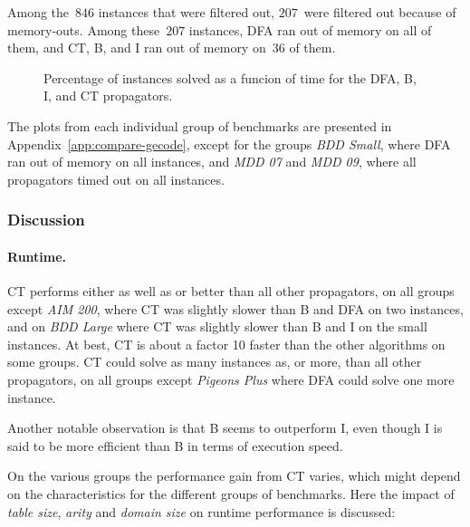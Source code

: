 \documentclass[a4paper,11pt]{article}
\numberwithin{equation}{section}
\begin{document}
Among the~$846$ instances that were filtered out, $207$~were filtered out
because of memory-outs. Among these~$207$ instances, DFA ran out of memory on all of them,
and CT, B, and I ran out of memory on~$36$ of them.

\begin{figure}
  \centering
  \begin{tikzpicture}[every mark/.append style={mark size=4pt}]%
    
  \end{tikzpicture}
  \caption{Percentage of instances solved as a funcion of time for the DFA, B, I, and CT 
    propagators.}
  \label{fig:total}
\end{figure}

The plots from each individual group of benchmarks are presented 
in Appendix~\ref{app:compare-gecode},
except for the groups \emph{BDD Small}, where DFA ran out of memory on all instances,
and \emph{MDD 07} and \emph{MDD 09}, 
where all propagators timed out on all instances.

\subsubsection{Discussion}

\paragraph{Runtime.}
CT performs either as well as or better than all other propagators,
on all groups except \emph{AIM 200}, where CT was slightly slower than B and DFA
on two instances, and on \emph{BDD Large} where CT was slightly
slower than B and I on the small instances. At best, CT is about a factor 10 faster
than the other algorithms on some groups.
CT could solve as many instances as, or more, than all other propagators,
on all groups except \emph{Pigeons Plus} where DFA could solve one more instance.

Another notable observation is that B seems to outperform I, even though I is said to
be more efficient than B in terms of execution speed.

On the various groups the performance gain from CT varies, which might depend
on the characteristics for the different groups of benchmarks. Here the impact
of \emph{table size}, \emph{arity} and \emph{domain size} on runtime performance
is discussed:
\end{document}
